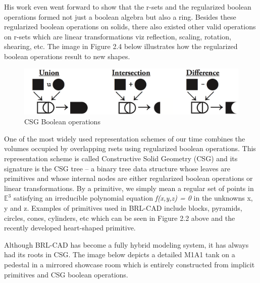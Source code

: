 \hspace{30} His   work   even   went   forward   to   show   that   the   r-­sets   and   the   regularized  
boolean   operations   formed   not   just   a   boolean   algebra   but   also   a   ring.   Besides  
these   regularized   boolean   operations   on   solids,   there   also   existed   other   valid  
operations   on   r-­sets   which   are   linear   transformations   viz   reflection,   scaling,  
rotation,   shearing,   etc.   The   image   in   Figure   2.4   below   illustrates   how   the  
regularized boolean operations result to new shapes.

\begin{figure}[htbp]
\centering
\includegraphics[trim=0.0cm 0.5cm 0.1cm 0.1cm, clip=true, totalheight=0.12\textheight]{Pictures/Boolean.png}
\caption[CSG Boolean operations]{CSG Boolean operations}
\label{Boolean}
\end{figure}

\hspace{30} One of the most widely used representation schemes of our time
combines the volumes occupied by overlapping r­sets using regularized
boolean operations. This representation scheme is called Constructive Solid
Geometry (CSG) and its signature is the CSG tree – a binary tree data
structure whose leaves are primitives and whose internal nodes are either
regularized boolean operations or linear transformations. By a primitive, we
simply mean a regular set of points in $\mathbb{E}^3$ satisfying an irreducible
polynomial equation \textit{f(x,y,z) = 0} in the unknowns x, y and z. Examples of
primitives used in BRL-­CAD include blocks, pyramids, circles, cones,
cylinders, etc which can be seen in Figure 2.2 above and the recently developed
heart­-shaped primitive. 

\hspace{30} Although   BRL-­CAD   has   become   a   fully   hybrid   modeling   system,   it   has  
always   had   its   roots   in   CSG.   The   image   below   depicts   a   detailed   M1A1   tank   on  
a   pedestal   in   a   mirrored   showcase   room   which   is   entirely   constructed   from  
implicit primitives and CSG boolean operations.  

